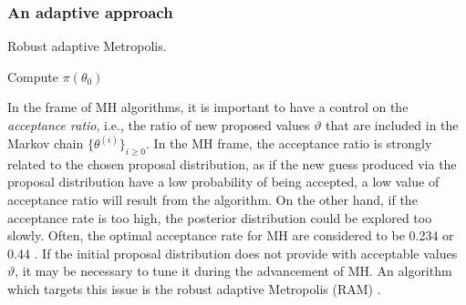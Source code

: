 \subsubsection{An adaptive approach}
\begin{algorithm}[t]
	\caption{Robust adaptive Metropolis.}
	\label{alg:RAM}
	Compute $\pi(\theta_0)$ \;
\end{algorithm}
In the frame of MH algorithms, it is important to have a control on the \textit{acceptance ratio}, i.e., the ratio of new proposed values $\vartheta$ that are included in the Markov chain $\{\theta^{(i)}\}_{i\geq 0}$. In the MH frame, the acceptance ratio is strongly related to the chosen proposal distribution, as if the new guess produced via the proposal distribution have a low probability of being accepted, a low value of acceptance ratio will result from the algorithm. On the other hand, if the acceptance rate is too high, the posterior distribution could be explored too slowly. Often, the optimal acceptance rate for MH are considered to be 0.234 or 0.44 \cite{Vih12}. If the initial proposal distribution does not provide with acceptable values $\vartheta$, it may be necessary to tune it during the advancement of MH. An algorithm which targets this issue is the robust adaptive Metropolis (RAM) \cite{Vih12}. 

